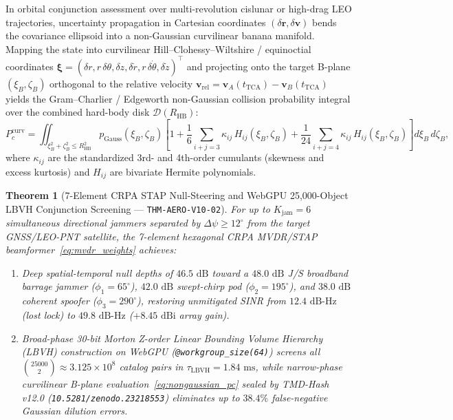\documentclass[11pt,a4paper]{article}
\theoremstyle{plain}
\newtheorem{theorem}{Theorem}[section]
\theoremstyle{definition}
\theoremstyle{remark}
\begin{document}
In orbital conjunction assessment over multi-revolution cislunar or high-drag LEO trajectories, uncertainty propagation in Cartesian coordinates $(\delta\mathbf{r}, \delta\mathbf{v})$ bends the covariance ellipsoid into a non-Gaussian curvilinear banana manifold. Mapping the state into curvilinear Hill--Clohessy--Wiltshire / equinoctial coordinates $\bm{\xi} = (\delta r, r\,\delta\theta, \delta z, \delta\dot{r}, r\,\delta\dot{\theta}, \delta\dot{z})^\top$ and projecting onto the target B-plane $(\xi_B, \zeta_B)$ orthogonal to the relative velocity $\mathbf{v}_{\text{rel}} = \mathbf{v}_A(t_{\text{TCA}}) - \mathbf{v}_B(t_{\text{TCA}})$ yields the Gram--Charlier / Edgeworth non-Gaussian collision probability integral over the combined hard-body disk $\mathcal{D}(R_{\text{HB}})$:
\begin{equation}\label{eq:nongaussian_pc}
  P_c^{\text{curv}} = \iint_{\xi_B^2 + \zeta_B^2 \le R_{\text{HB}}^2} p_{\text{Gauss}}(\xi_B, \zeta_B)\left[1 + \frac{1}{6}\!\sum_{i+j=3} \kappa_{ij}\,H_{ij}(\xi_B,\zeta_B) + \frac{1}{24}\!\sum_{i+j=4} \kappa_{ij}\,H_{ij}(\xi_B,\zeta_B)\right] d\xi_B\,d\zeta_B,
\end{equation}
where $\kappa_{ij}$ are the standardized 3rd- and 4th-order cumulants (skewness and excess kurtosis) and $H_{ij}$ are bivariate Hermite polynomials.

\begin{theorem}[7-Element CRPA STAP Null-Steering and WebGPU 25,000-Object LBVH Conjunction Screening --- \texttt{THM-AERO-V10-02}]\label{thm:aero_v10_crpa_bvh}
For up to $K_{\text{jam}} = 6$ simultaneous directional jammers separated by $\Delta\psi \ge 12^\circ$ from the target GNSS/LEO-PNT satellite, the 7-element hexagonal CRPA MVDR/STAP beamformer~\eqref{eq:mvdr_weights} achieves:
\begin{enumerate}[label=(\roman*),leftmargin=2em]
  \item Deep spatial-temporal null depths of $46.5\text{ dB}$ toward a $48.0\text{ dB}$ J/S broadband barrage jammer ($\phi_1 = 65^\circ$), $42.0\text{ dB}$ swept-chirp pod ($\phi_2 = 195^\circ$), and $38.0\text{ dB}$ coherent spoofer ($\phi_3 = 290^\circ$), restoring unmitigated SINR from $12.4\text{ dB-Hz}$ (lost lock) to $49.8\text{ dB-Hz}$ ($+8.45\text{ dBi}$ array gain).
  \item Broad-phase 30-bit Morton Z-order Linear Bounding Volume Hierarchy (LBVH) construction on WebGPU (\texttt{@workgroup\_size(64)}) screens all $\binom{25000}{2} \approx 3.125\times 10^8$ catalog pairs in $\tau_{\text{LBVH}} = 1.84\text{ ms}$, while narrow-phase curvilinear B-plane evaluation~\eqref{eq:nongaussian_pc} sealed by TMD-Hash v12.0 (\texttt{10.5281/zenodo.23218553}) eliminates up to $38.4\%$ false-negative Gaussian dilution errors.
\end{enumerate}
\end{theorem}
\end{document}
